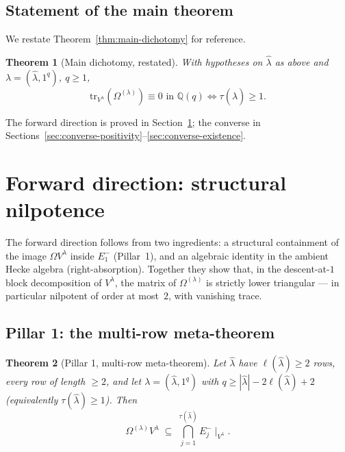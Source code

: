 \documentclass[11pt]{article}
\newtheorem{theorem}{Theorem}[section]
\theoremstyle{definition}
\newcommand{\Vlam}{V^{\lambda}}
\newcommand{\Om}{\Omega}
\newcommand{\bla}{\widehat\lambda}
\newcommand{\elh}{\ell(\bla)}
\newcommand{\tr}{\mathrm{tr}}
\newcommand{\Eminus}{E^{-}}
\begin{document}
\subsection{Statement of the main theorem}

We restate Theorem~\ref{thm:main-dichotomy} for reference.

\begin{theorem}[Main dichotomy, restated]\label{thm:dichotomy-restate}
With hypotheses on $\bla$ as above and $\lambda = (\bla, 1^q)$, $q \ge 1$,
\[
   \tr_{\Vlam}(\Om^{(\lambda)}) \equiv 0 \text{ in } \mathbb{Q}(q)
   \iff
   \tau(\bla) \ge 1.
\]
\end{theorem}

The forward direction is proved in Section~\ref{sec:forward}; the converse in Sections~\ref{sec:converse-positivity}--\ref{sec:converse-existence}.

\section{Forward direction: structural nilpotence}\label{sec:forward}

The forward direction follows from two ingredients: a structural containment of the image $\Om \Vlam$ inside $\Eminus_1$ (Pillar~1), and an algebraic identity in the ambient Hecke algebra (right-absorption).  Together they show that, in the descent-at-$1$ block decomposition of $\Vlam$, the matrix of $\Om^{(\lambda)}$ is strictly lower triangular --- in particular nilpotent of order at most~$2$, with vanishing trace.

\subsection{Pillar 1: the multi-row meta-theorem}

\begin{theorem}[Pillar 1, multi-row meta-theorem]\label{thm:pillar1}
Let $\bla$ have $\elh \ge 2$ rows, every row of length $\ge 2$, and let $\lambda = (\bla, 1^q)$ with $q \ge |\bla| - 2\elh + 2$ (equivalently $\tau(\bla) \ge 1$).  Then
\[
   \Om^{(\lambda)} \Vlam \;\subseteq\; \bigcap_{j=1}^{\tau(\bla)} \Eminus_j\!\mid_{\Vlam}.
\]
\end{theorem}

\end{document}
